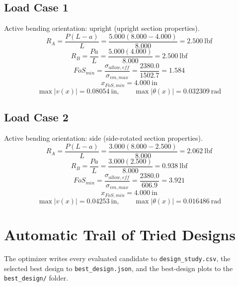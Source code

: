 \documentclass[11pt]{article}
\begin{document}
\subsection*{Load Case 1}
Active bending orientation: upright (upright section properties).
\[R_A = \frac{P(L-a)}{L} = \frac{5.000(8.000-4.000)}{8.000} = 2.500\ \mathrm{lbf}\]
\[R_B = \frac{Pa}{L} = \frac{5.000(4.000)}{8.000} = 2.500\ \mathrm{lbf}\]
\[FoS_{min} = \frac{\sigma_{allow,eff}}{\sigma_{vm,max}} = \frac{2380.0}{1502.7} = 1.584\]
\[x_{FoS,min} = 4.000\ \mathrm{in}\]
\[\max |v(x)| = 0.08054\ \mathrm{in}, \qquad \max |\theta(x)| = 0.032309\ \mathrm{rad}\]
\subsection*{Load Case 2}
Active bending orientation: side (side-rotated section properties).
\[R_A = \frac{P(L-a)}{L} = \frac{3.000(8.000-2.500)}{8.000} = 2.062\ \mathrm{lbf}\]
\[R_B = \frac{Pa}{L} = \frac{3.000(2.500)}{8.000} = 0.938\ \mathrm{lbf}\]
\[FoS_{min} = \frac{\sigma_{allow,eff}}{\sigma_{vm,max}} = \frac{2380.0}{606.9} = 3.921\]
\[x_{FoS,min} = 4.000\ \mathrm{in}\]
\[\max |v(x)| = 0.04253\ \mathrm{in}, \qquad \max |\theta(x)| = 0.016486\ \mathrm{rad}\]

\section*{Automatic Trail of Tried Designs}
The optimizer writes every evaluated candidate to \texttt{design\_study.csv}, the selected best design to \texttt{best\_design.json}, and the best-design plots to the \texttt{best\_design/} folder.
\end{document}
